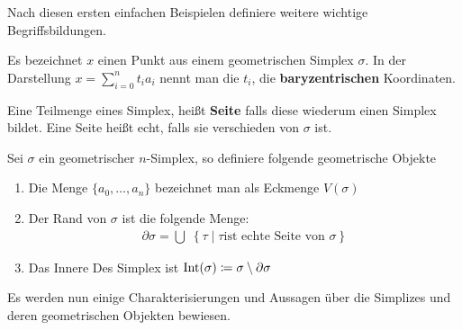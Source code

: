 
Nach diesen ersten einfachen Beispielen definiere weitere wichtige
Begriffsbildungen.

\begin{Def}
  Es bezeichnet $x$ einen Punkt aus einem geometrischen Simplex
  $\sigma$. In der Darstellung $x = \sum\limits_{i=0}^n t_i a_i$ nennt
  man die $t_i$, die \textbf{baryzentrischen} Koordinaten.
	
  Eine Teilmenge eines Simplex, heißt \textbf{Seite} falls diese
  wiederum einen Simplex bildet. Eine Seite heißt echt, falls sie
  verschieden von $\sigma$ ist.
\end{Def}

\begin{Def}
  Sei $\sigma$ ein geometrischer $n$-Simplex, so definiere folgende
  geometrische Objekte
  \begin{enumerate}[{\bfseries1)}]
  \item Die Menge $\{ a_0 , \ldots , a_n \}$ bezeichnet man als
    Eckmenge $V(\sigma)$
  \item Der Rand von $\sigma$ ist die folgende Menge:
    \begin{gather*}
      \partial\sigma = \bigcup \; \left\{ \tau \; \Big| \; \tau \text{
          ist echte Seite von } \sigma \right\}
    \end{gather*}
  \item Das Innere Des Simplex ist
    $\operatorname{Int}(\sigma) \coloneqq \sigma \setminus \partial\sigma$
  \end{enumerate}
\end{Def}

Es werden nun einige Charakterisierungen und Aussagen über die
Simplizes und deren geometrischen Objekten bewiesen.

